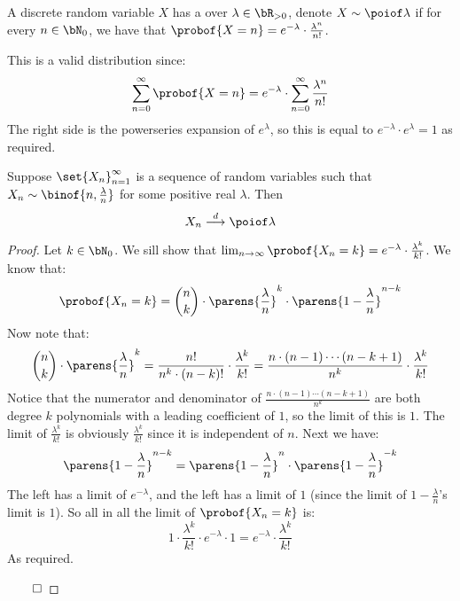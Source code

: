 \begin{defn*}

	A discrete random variable $X$ has a  over $\lambda\in\bR_{>0}$, denote $X\sim\poiof\lambda$ if
	for every $n\in\bN_0$, we have that $\probof{X=n}=e^{-\lambda}\cdot\frac{\lambda^n}{n!}$.

\end{defn*}

\begin{note}

	This is a valid distribution since:
	\[ \sum_{n=0}^\infty \probof{X=n} = e^{-\lambda}\cdot\sum_{n=0}^\infty\frac{\lambda^n}{n!} \]
	The right side is the powerseries expansion of $e^\lambda$, so this is equal to $e^{-\lambda}\cdot e^\lambda=1$ as required.

\end{note}

\begin{thrm*}

	Suppose $\set{X_n}_{n=1}^\infty$ is a sequence of random variables such that $X_n\sim\binof{n,\frac\lambda n}$ for some positive
	real $\lambda$.
	Then
	\[ X_n\dilim\poiof\lambda \]

\end{thrm*}

\begin{proof}

	Let $k\in\bN_0$.
	We sill show that $\lim_{n\to\infty}\probof{X_n=k} = e^{-\lambda}\cdot\frac{\lambda^k}{k!}$.
	We know that:
	\[ \probof{X_n=k} = \binom nk\cdot \parens{\frac\lambda n}^k\cdot\parens{1-\frac\lambda n}^{n-k} \]
	Now note that:
	\[ \binom nk \cdot\parens{\frac\lambda n}^k = \frac{n!}{n^k\cdot(n-k)!} \cdot \frac{\lambda^k}{k!} =
	\frac{n\cdot(n-1)\cdots(n-k+1)}{n^k}\cdot\frac{\lambda^k}{k!} \]
	Notice that the numerator and denominator of $\frac{n\cdot(n-1)\cdots(n-k+1)}{n^k}$ are both degree $k$ polynomials with a leading
	coefficient of $1$, so the limit of this is $1$.
	The limit of $\frac{\lambda^k}{k!}$ is obviously $\frac{\lambda^k}{k!}$ since it is independent of $n$.
	Next we have:
	\[ \parens{1-\frac\lambda n}^{n-k} = \parens{1-\frac\lambda n}^n \cdot \parens{1-\frac\lambda n}^{-k} \]
	The left has a limit of $e^{-\lambda}$, and the left has a limit of $1$ (since the limit of $1-\frac\lambda n$'s limit is $1$).
	So all in all the limit of $\probof{X_n=k}$ is:
	\[ 1\cdot\frac{\lambda^k}{k!}\cdot e^{-\lambda} \cdot 1 = e^{-\lambda}\cdot\frac{\lambda^k}{k!} \]
	As required.

	\hfill$\qed$

\end{proof}

